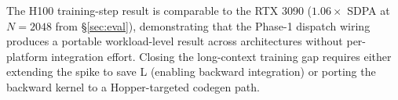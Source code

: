 The H100 training-step result is comparable to the RTX 3090
($1.06\times$ SDPA at $N{=}2048$ from \S\ref{sec:eval}), demonstrating
that the Phase-1 dispatch wiring produces a portable workload-level
result across architectures without per-platform integration effort.
Closing the long-context training gap requires either extending the
spike to save L (enabling backward integration) or porting the
backward kernel to a Hopper-targeted codegen path.


%
%
%
